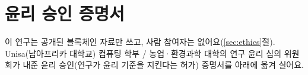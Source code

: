 \section{윤리 승인 증명서}
\label{ch:appendix-ethics}


이 연구는 공개된 블록체인 자료만 쓰고, 사람 참여자는 없어요(\ref{sec:ethics}절). Unisa(남아프리카 대학교) 컴퓨팅 학부 / 농업·환경과학 대학의 연구 윤리 심의 위원회가 내준 윤리 승인(연구가 윤리 기준을 지킨다는 허가) 증명서를 아래에 옮겨 실어요.

\begin{center}
\end{center}
